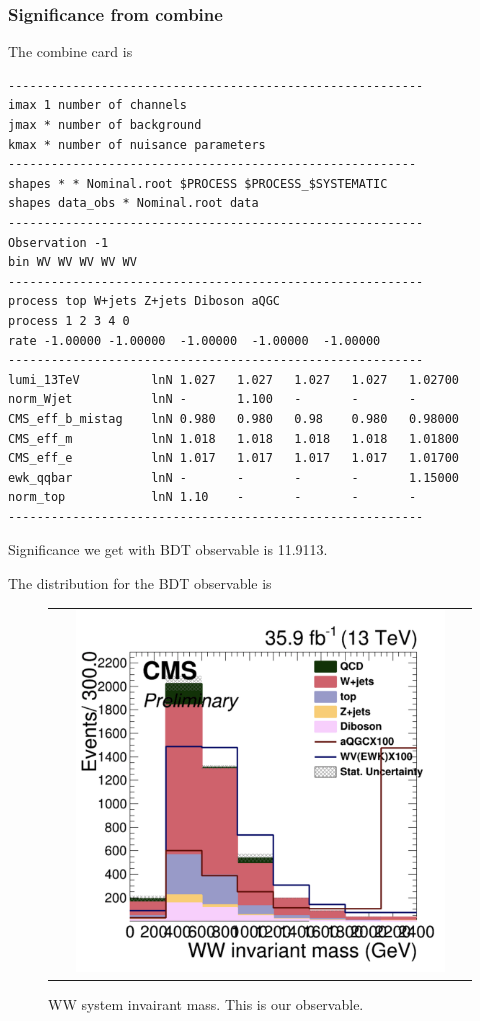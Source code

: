 \subsubsection{Significance from combine}
The combine card is
\begin{verbatim}
----------------------------------------------------------
imax 1 number of channels
jmax * number of background
kmax * number of nuisance parameters
---------------------------------------------------------
shapes * * Nominal.root $PROCESS $PROCESS_$SYSTEMATIC
shapes data_obs * Nominal.root data
----------------------------------------------------------
Observation -1
bin WV WV WV WV WV
----------------------------------------------------------
process top W+jets Z+jets Diboson aQGC
process 1 2 3 4 0
rate -1.00000 -1.00000  -1.00000  -1.00000  -1.00000  
----------------------------------------------------------
lumi_13TeV			lnN	1.027	1.027	1.027	1.027	1.02700  
norm_Wjet 			lnN	-		1.100	-		-		-  
CMS_eff_b_mistag	lnN	0.980	0.980	0.98	0.980	0.98000
CMS_eff_m      		lnN	1.018	1.018	1.018	1.018	1.01800
CMS_eff_e      		lnN	1.017	1.017	1.017	1.017	1.01700
ewk_qqbar      		lnN	-		-		-		-		1.15000   
norm_top          	lnN	1.10	-		-		-		-  
----------------------------------------------------------
\end{verbatim}

Significance we get with BDT observable is 11.9113.

The distribution for the BDT observable is 
\begin{figure}[htb]
  \begin{center}
    \begin{tabular}{c}
    \includegraphics[width=0.90\textwidth]{Plots/BDT_Performance/Trial2/mWW.png}    
    \end{tabular}
    \caption{WW system invairant mass. This is our observable.}
    \label{fig:gen1}
  \end{center}
\end{figure}


